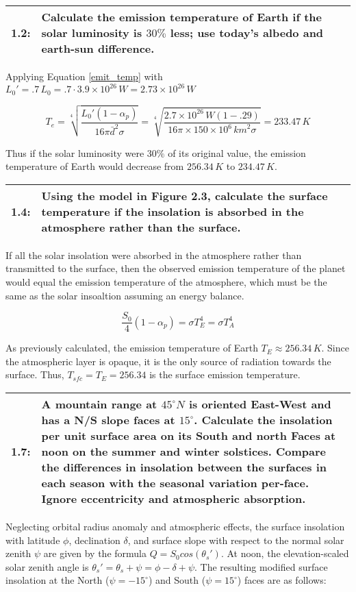 \documentclass[12pt]{article}
\newcommand*{\problem}[2]{
    \begin{table}[ht]
    \centering
        \begin{tabular}{ | p{.1\linewidth} p{.9\linewidth} | }
            \hline
            \vspace{.3em}\textbf{\large#1:} & \vspace{.3em}\small{#2}\hspace{.2em}\vspace{.5em} \\ \hline
        \end{tabular}
    \end{table}
}
\begin{document}
\clearpage

\problem{1.2}{Calculate the emission temperature of Earth if the solar luminosity is $30\%$ less; use today's albedo and earth-sun difference.}

Applying Equation \ref{emit_temp} with $L_0' = .7\,L_0 = .7\cdot3.9\times10^{26}\,\si{W} = 2.73\times10^{26}\,\si{W}$

\[
    T_e = \sqrt[4]{\frac{L_0' (1-\alpha_p)}{16\pi \bar{d}^2 \sigma}} = \sqrt[4]{\frac{2.7\times10^{26}\,\si{W}(1-.29)}{16\pi \times 150\times10^6\,\si{km}^2 \sigma}} = 233.47\,\si{K}
\]

Thus if the solar luminosity were $30\%$ of its original value, the emission temperature of Earth would decrease from $256.34\,\si{K}$ to $234.47\,\si{K}$.

\problem{1.4}{Using the model in Figure 2.3, calculate the surface temperature if the insolation is absorbed in the atmosphere rather than the surface.}

If all the solar insolation were absorbed in the atmosphere rather than transmitted to the surface, then the observed emission temperature of the planet would equal the emission temperature of the atmosphere, which must be the same as the solar insoaltion assuming an energy balance.

\[
    \frac{S_0}{4}(1-\alpha_p) = \sigma T^4_E = \sigma T^4_A
\]

As previously calculated, the emission temperature of Earth $T_E \approx 256.34\,\si{K}$. Since the atmospheric layer is opaque, it is the only source of radiation towards the surface. Thus, $T_{sfc} = T_E = 256.34$ is the surface emission temperature.

\problem{1.7}{A mountain range at $45^\circ N$ is oriented East-West and has a N/S slope faces at $15^\circ$. Calculate the insolation per unit surface area on its South and north Faces at noon on the summer and winter solstices. Compare the differences in insolation between the surfaces in each season with the seasonal variation per-face. Ignore eccentricity and atmospheric absorption.}

Neglecting orbital radius anomaly and atmospheric effects, the surface insolation with latitude $\phi$, declination $\delta$, and surface slope with respect to the normal solar zenith $\psi$ are given by the formula $Q = S_0 cos(\theta_s')$. At noon, the elevation-scaled solar zenith angle is $\theta_s ' = \theta_s + \psi = \phi - \delta + \psi$. The resulting modified surface insolation at the North ($\psi = -15^\circ$) and South ($\psi = 15^\circ$) faces are as follows:
\end{document}
